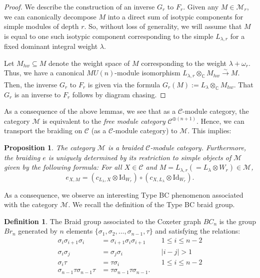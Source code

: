 \documentclass{amsart}
\numberwithin{equation}{section}
\theoremstyle{theorem}
\newtheorem{proposition}[theorem]{Proposition}
\theoremstyle{definition}
\newtheorem{definition}[theorem]{Definition}
\newcommand{\sub}{\subseteq}
\newcommand{\CC}{\mathbb{C}}
\newcommand{\cc}{\mathcal{C}}
\newcommand{\mm}{\mathcal{M}}
\newcommand{\xra}{\xrightarrow[]}
\begin{document}
\begin{proof}
We describe the construction of an inverse $G_r$ to $F_r$. Given any $M\in \mm_r$, we can canonically decompose $M$ into a direct sum of isotypic components for simple modules of depth $r$. So, without loss of generality, we will assume that $M$ is equal to one such isotypic component corresponding to the simple $L_{\lambda,r}$ for a fixed dominant integral weight $\lambda$.

Let $M_{hw}\sub M$ denote the weight space of $M$ corresponding to the weight $\lambda+\omega_r$. Thus, we have a canonical $MU(n)$-module isomorphism $L_{\lambda,r}\otimes_{\CC} M_{hw} \xra{\sim} M$. Then, the inverse $G_r$ to $F_r$ is given via the formula $G_r(M):=L_{\lambda}\otimes_{\CC} M_{hw}$. That $G_r$ is an inverse to $F_r$ follows by diagram chasing.
\end{proof}

As a consequence of the above lemmas, we see that as a $\cc$-module category, the category $\mm$ is equivalent to the \emph{free module category} $\cc^{\oplus(n+1)}$. Hence, we can transport the braiding on $\cc$ (as a $\cc$-module category) to $\mm$. This implies:

\begin{proposition} \label{prop:bmc}
The category $\mm$ is a braided $\cc$-module category. Furthermore, the braiding $e$ is uniquely determined by its restriction to simple objects of $\mm$ given by the following formula: For all $X\in \cc$ and $M=L_{\lambda,r}(=L_{\lambda}\otimes W_r)\in\mm$,
\[e_{X, M}=(c_{L_{\lambda},X}\otimes \mathrm{Id}_{W_r})\circ (c_{X,L_{\lambda}}\otimes \mathrm{Id}_{W_r}).\]
\end{proposition}

As a consequence, we observe an interesting Type BC phenomenon associated with the category $\mm$. We recall the definition of the Type BC braid group.

\begin{definition}
The Braid group associated to the Coxeter graph $BC_n$ is the group $Br_n$ generated by $n$ elements $\{\sigma_1,\sigma_2,\dots,\sigma_{n-1},\tau\}$ and satisfying the relations:
\begin{align*}
\sigma_i\sigma_{i+1}\sigma_i&=\sigma_{i+1}\sigma_i\sigma_{i+1}&&1\leq i\leq n-2\\
\sigma_i\sigma_j&=\sigma_j\sigma_i&&|i-j|>1\\
\sigma_i\tau&=\tau\sigma_i&&1\leq i\leq n-2\\
\sigma_{n-1}\tau\sigma_{n-1}\tau&=\tau\sigma_{n-1}\tau\sigma_{n-1}.
\end{align*}
\end{definition}
\end{document}
